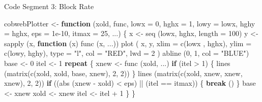\documentclass[
  12pt,
]{book}
\newenvironment{Shaded}{\begin{snugshade}}{\end{snugshade}}
\newcommand{\AttributeTok}[1]{\textcolor[rgb]{0.77,0.63,0.00}{#1}}
\newcommand{\ControlFlowTok}[1]{\textcolor[rgb]{0.13,0.29,0.53}{\textbf{#1}}}
\newcommand{\DecValTok}[1]{\textcolor[rgb]{0.00,0.00,0.81}{#1}}
\newcommand{\FloatTok}[1]{\textcolor[rgb]{0.00,0.00,0.81}{#1}}
\newcommand{\FunctionTok}[1]{\textcolor[rgb]{0.00,0.00,0.00}{#1}}
\newcommand{\NormalTok}[1]{#1}
\newcommand{\OtherTok}[1]{\textcolor[rgb]{0.56,0.35,0.01}{#1}}
\newcommand{\SpecialCharTok}[1]{\textcolor[rgb]{0.00,0.00,0.00}{#1}}
\newcommand{\StringTok}[1]{\textcolor[rgb]{0.31,0.60,0.02}{#1}}
\begin{document}
Code Segment 3: Block Rate

\begin{Shaded}
\begin{Highlighting}[]
\NormalTok{cobwebPlotter }\OtherTok{\textless{}{-}}
  \ControlFlowTok{function}\NormalTok{ (xold,}
\NormalTok{            func,}
            \AttributeTok{lowx =} \DecValTok{0}\NormalTok{,}
            \AttributeTok{hghx =} \DecValTok{1}\NormalTok{,}
            \AttributeTok{lowy =}\NormalTok{ lowx,}
            \AttributeTok{hghy =}\NormalTok{ hghx,}
            \AttributeTok{eps =} \FloatTok{1e{-}10}\NormalTok{,}
            \AttributeTok{itmax =} \DecValTok{25}\NormalTok{,}
\NormalTok{            ...) \{}
\NormalTok{    x }\OtherTok{\textless{}{-}} \FunctionTok{seq}\NormalTok{ (lowx, hghx, }\AttributeTok{length =} \DecValTok{100}\NormalTok{)}
\NormalTok{    y }\OtherTok{\textless{}{-}} \FunctionTok{sapply}\NormalTok{ (x, }\ControlFlowTok{function}\NormalTok{ (x)}
      \FunctionTok{func}\NormalTok{ (x, ...))}
    \FunctionTok{plot}\NormalTok{ (}
\NormalTok{      x,}
\NormalTok{      y,}
      \AttributeTok{xlim =} \FunctionTok{c}\NormalTok{(lowx , hghx),}
      \AttributeTok{ylim =} \FunctionTok{c}\NormalTok{(lowy, hghy),}
      \AttributeTok{type =} \StringTok{"l"}\NormalTok{,}
      \AttributeTok{col =} \StringTok{"RED"}\NormalTok{,}
      \AttributeTok{lwd =} \DecValTok{2}
\NormalTok{    )}
    \FunctionTok{abline}\NormalTok{ (}\DecValTok{0}\NormalTok{, }\DecValTok{1}\NormalTok{, }\AttributeTok{col =} \StringTok{"BLUE"}\NormalTok{)}
\NormalTok{    base }\OtherTok{\textless{}{-}} \DecValTok{0}
\NormalTok{    itel }\OtherTok{\textless{}{-}} \DecValTok{1}
    \ControlFlowTok{repeat}\NormalTok{ \{}
\NormalTok{      xnew }\OtherTok{\textless{}{-}} \FunctionTok{func}\NormalTok{ (xold, ...)}
      \ControlFlowTok{if}\NormalTok{ (itel }\SpecialCharTok{\textgreater{}} \DecValTok{1}\NormalTok{) \{}
        \FunctionTok{lines}\NormalTok{ (}\FunctionTok{matrix}\NormalTok{(}\FunctionTok{c}\NormalTok{(xold, xold, base, xnew), }\DecValTok{2}\NormalTok{, }\DecValTok{2}\NormalTok{))}
\NormalTok{      \}}
      \FunctionTok{lines}\NormalTok{ (}\FunctionTok{matrix}\NormalTok{(}\FunctionTok{c}\NormalTok{(xold, xnew, xnew, xnew), }\DecValTok{2}\NormalTok{, }\DecValTok{2}\NormalTok{))}
      \ControlFlowTok{if}\NormalTok{ ((}\FunctionTok{abs}\NormalTok{ (xnew }\SpecialCharTok{{-}}\NormalTok{ xold) }\SpecialCharTok{\textless{}}\NormalTok{ eps) }\SpecialCharTok{||}\NormalTok{ (itel }\SpecialCharTok{==}\NormalTok{ itmax)) \{}
        \ControlFlowTok{break}\NormalTok{ ()}
\NormalTok{      \}}
\NormalTok{      base }\OtherTok{\textless{}{-}}\NormalTok{ xnew}
\NormalTok{      xold }\OtherTok{\textless{}{-}}\NormalTok{ xnew}
\NormalTok{      itel }\OtherTok{\textless{}{-}}\NormalTok{ itel }\SpecialCharTok{+} \DecValTok{1}
\NormalTok{    \}}
\NormalTok{  \}}
\end{Highlighting}
\end{Shaded}
\end{document}
